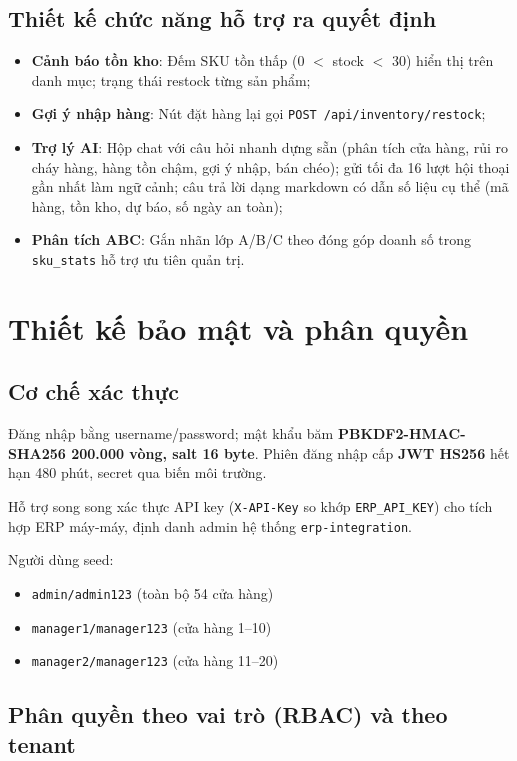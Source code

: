 \documentclass[12pt,a4paper]{report}
\begin{document}
\subsection{Thiết kế chức năng hỗ trợ ra quyết định}

\begin{itemize}
    \item \textbf{Cảnh báo tồn kho}: Đếm SKU tồn thấp (0 $<$ stock $<$ 30) hiển thị trên danh mục; trạng thái restock từng sản phẩm;
    \item \textbf{Gợi ý nhập hàng}: Nút đặt hàng lại gọi \texttt{POST /api/inventory/restock};
    \item \textbf{Trợ lý AI}: Hộp chat với câu hỏi nhanh dựng sẵn (phân tích cửa hàng, rủi ro cháy hàng, hàng tồn chậm, gợi ý nhập, bán chéo); gửi tối đa 16 lượt hội thoại gần nhất làm ngữ cảnh; câu trả lời dạng markdown có dẫn số liệu cụ thể (mã hàng, tồn kho, dự báo, số ngày an toàn);
    \item \textbf{Phân tích ABC}: Gắn nhãn lớp A/B/C theo đóng góp doanh số trong \texttt{sku\_stats} hỗ trợ ưu tiên quản trị.
\end{itemize}

\section{Thiết kế bảo mật và phân quyền}

\subsection{Cơ chế xác thực}

Đăng nhập bằng username/password; mật khẩu băm \textbf{PBKDF2-HMAC-SHA256 200.000 vòng, salt 16 byte}. Phiên đăng nhập cấp \textbf{JWT HS256} hết hạn 480 phút, secret qua biến môi trường.

Hỗ trợ song song xác thực API key (\texttt{X-API-Key} so khớp \texttt{ERP\_API\_KEY}) cho tích hợp ERP máy-máy, định danh admin hệ thống \texttt{erp-integration}.

Người dùng seed:
\begin{itemize}
    \item \texttt{admin/admin123} (toàn bộ 54 cửa hàng)
    \item \texttt{manager1/manager123} (cửa hàng 1--10)
    \item \texttt{manager2/manager123} (cửa hàng 11--20)
\end{itemize}

\subsection{Phân quyền theo vai trò (RBAC) và theo tenant}
\end{document}
